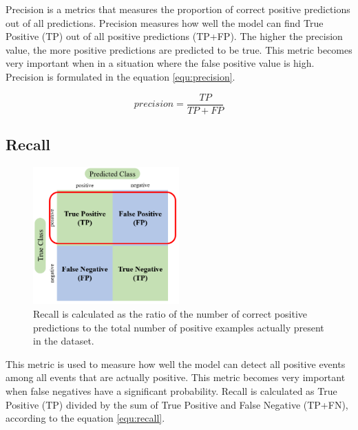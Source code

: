 Precision is a metrics that measures the proportion of correct positive predictions out of all predictions. Precision measures how well the model can find True Positive (TP) out of all positive predictions (TP+FP). The higher the precision value, the more positive predictions are predicted to be true. This metric becomes very important when in a situation where the false positive value is high. Precision is formulated in the equation \ref{equ:precision}.

\begin{equation}
    \label{equ:precision}
    precision=\frac{TP}{TP+FP}
\end{equation}

\subsection{Recall}
\label{subsec3: recall}

\begin{figure}[h!]
    \centering
    \includegraphics[width=0.5\textwidth]{bab2/ar_Recall.png}
    \caption{Recall is calculated as the ratio of the number of correct positive predictions to the total number of positive examples actually present in the dataset.}
    \label{fig:MetricRecall}
\end{figure}

This metric is used to measure how well the model can detect all positive events among all events that are actually positive. This metric becomes very important when false negatives have a significant probability. Recall is calculated as True Positive (TP) divided by the sum of True Positive and False Negative (TP+FN), according to the equation \ref{equ:recall}.

